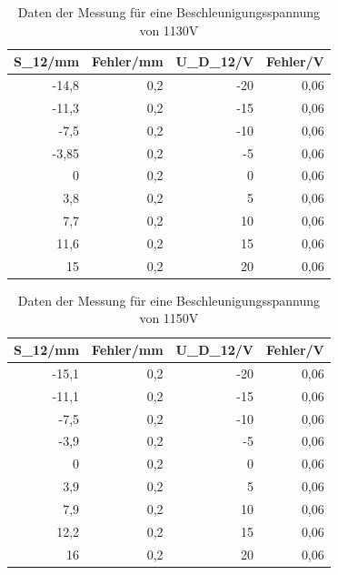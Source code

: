 \documentclass[12pt]{scrartcl}
\begin{document}
\begin{table}[htbp]
\caption{Daten der Messung für eine Beschleunigungsspannung von 1130V}
\begin{center}
\begin{tabular}{|r|r|r|r|}
\hline
\multicolumn{1}{|l|}{S\_12/mm} & \multicolumn{1}{l|}{Fehler/mm} & \multicolumn{1}{l|}{U\_D\_12/V} & \multicolumn{1}{l|}{Fehler/V} \\ \hline
-14,8 & 0,2 & -20 & 0,06 \\ \hline
-11,3 & 0,2 & -15 & 0,06 \\ \hline
-7,5 & 0,2 & -10 & 0,06 \\ \hline
-3,85 & 0,2 & -5 & 0,06 \\ \hline
0 & 0,2 & 0 & 0,06 \\ \hline
3,8 & 0,2 & 5 & 0,06 \\ \hline
7,7 & 0,2 & 10 & 0,06 \\ \hline
11,6 & 0,2 & 15 & 0,06 \\ \hline
15 & 0,2 & 20 & 0,06 \\ \hline
\end{tabular}
\end{center}
\label{tab:materialeigenschaften}
\end{table}




\begin{table}[htbp]
\caption{Daten der Messung für eine Beschleunigungsspannung von 1150V}
\begin{center}
\begin{tabular}{|r|r|r|r|}
\hline
\multicolumn{1}{|l|}{S\_12/mm} & \multicolumn{1}{l|}{Fehler/mm} & \multicolumn{1}{l|}{U\_D\_12/V} & \multicolumn{1}{l|}{Fehler/V} \\ \hline
-15,1 & 0,2 & -20 & 0,06 \\ \hline
-11,1 & 0,2 & -15 & 0,06 \\ \hline
-7,5 & 0,2 & -10 & 0,06 \\ \hline
-3,9 & 0,2 & -5 & 0,06 \\ \hline
0 & 0,2 & 0 & 0,06 \\ \hline
3,9 & 0,2 & 5 & 0,06 \\ \hline
7,9 & 0,2 & 10 & 0,06 \\ \hline
12,2 & 0,2 & 15 & 0,06 \\ \hline
16 & 0,2 & 20 & 0,06 \\ \hline
\end{tabular}
\end{center}
\label{tab:materialeigenschaften}
\end{table}
\end{document}
